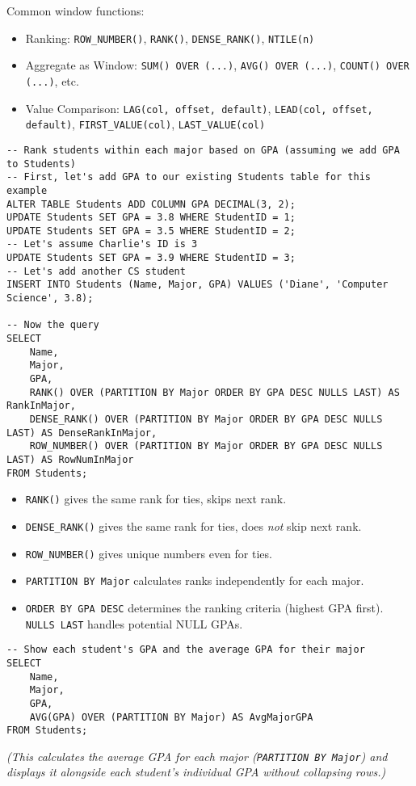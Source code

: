 \documentclass[12pt]{book}
\begin{document}
Common window functions:
\begin{itemize}
    \item Ranking: \texttt{ROW\_NUMBER()}, \texttt{RANK()}, \texttt{DENSE\_RANK()}, \texttt{NTILE(n)}
    \item Aggregate as Window: \texttt{SUM() OVER (...)}, \texttt{AVG() OVER (...)}, \texttt{COUNT() OVER (...)}, etc.
    \item Value Comparison: \texttt{LAG(col, offset, default)}, \texttt{LEAD(col, offset, default)}, \texttt{FIRST\_VALUE(col)}, \texttt{LAST\_VALUE(col)}
\end{itemize}

\begin{lstlisting}[caption={Window Function Example (Ranking)}, label=lst:window_rank]
-- Rank students within each major based on GPA (assuming we add GPA to Students)
-- First, let's add GPA to our existing Students table for this example
ALTER TABLE Students ADD COLUMN GPA DECIMAL(3, 2);
UPDATE Students SET GPA = 3.8 WHERE StudentID = 1;
UPDATE Students SET GPA = 3.5 WHERE StudentID = 2;
-- Let's assume Charlie's ID is 3
UPDATE Students SET GPA = 3.9 WHERE StudentID = 3;
-- Let's add another CS student
INSERT INTO Students (Name, Major, GPA) VALUES ('Diane', 'Computer Science', 3.8);

-- Now the query
SELECT
    Name,
    Major,
    GPA,
    RANK() OVER (PARTITION BY Major ORDER BY GPA DESC NULLS LAST) AS RankInMajor,
    DENSE_RANK() OVER (PARTITION BY Major ORDER BY GPA DESC NULLS LAST) AS DenseRankInMajor,
    ROW_NUMBER() OVER (PARTITION BY Major ORDER BY GPA DESC NULLS LAST) AS RowNumInMajor
FROM Students;
\end{lstlisting}
\begin{itemize}
    \item \texttt{RANK()} gives the same rank for ties, skips next rank.
    \item \texttt{DENSE\_RANK()} gives the same rank for ties, does \emph{not} skip next rank.
    \item \texttt{ROW\_NUMBER()} gives unique numbers even for ties.
    \item \texttt{PARTITION BY Major} calculates ranks independently for each major.
    \item \texttt{ORDER BY GPA DESC} determines the ranking criteria (highest GPA first). \texttt{NULLS LAST} handles potential NULL GPAs.
\end{itemize}


\begin{lstlisting}[caption={Window Function Example (Aggregation)}, label=lst:window_agg]
-- Show each student's GPA and the average GPA for their major
SELECT
    Name,
    Major,
    GPA,
    AVG(GPA) OVER (PARTITION BY Major) AS AvgMajorGPA
FROM Students;
\end{lstlisting}
\textit{(This calculates the average GPA for each major (\texttt{PARTITION BY Major}) and displays it alongside each student's individual GPA without collapsing rows.)}
\end{document}
